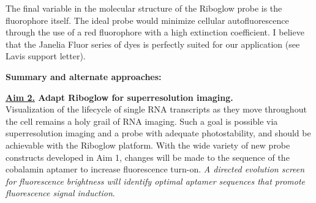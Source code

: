 
The final variable in the molecular structure of the Riboglow probe is the fluorophore itself. The ideal probe would minimize cellular autofluorescence through the use of a red fluorophore with a high extinction coefficient. I believe that the Janelia Fluor series of dyes is perfectly suited for our application (see Lavis support letter).\cite{Grimmgeneralmethodfinetune2017a} 

\textbf{Summary and alternate approaches:}

\textbf{\underline{Aim 2.} Adapt Riboglow for superresolution imaging.}\\
Visualization of the lifecycle of single RNA transcripts as they move throughout the cell remains a holy grail of RNA imaging.\comment{[Cite]} Such a goal is possible via superresolution imaging and a probe with adequate photostability, and should be achievable with the Riboglow platform. With the wide variety of new probe constructs developed in Aim 1, changes will be made to the sequence of the cobalamin aptamer to increase fluorescence turn-on. \textit{A directed evolution screen for fluorescence brightness will identify optimal aptamer sequences that promote fluorescence signal induction}.

